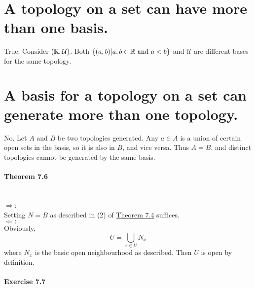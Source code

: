 \begin{parts}
 \part{A topology on a set can have more than one basis.}
 
\begin{solution}
 True. Consider $(\mathbb{R}, \mathcal{U})$. Both $\{(a,b)|a, b \in \mathbb{R} \text{ and } a < b\}$ and $\mathcal{U}$ are different bases for the same topology.
\end{solution}

 \part{A basis for a topology on a set can generate more than one topology.}
 
\begin{solution}
 No. Let $A$ and $B$ be two topologies generated. Any $a \in A$ is a union of certain open sets in the basis, so it is also in $B$, and vice versa. Thus $A = B$, and distinct topologies cannot be generated by the same basis.
\end{solution}
\end{parts}

\subsection{Theorem 7.6}
\setcounter{question}{0}


\begin{solution}
\\$\Rightarrow$: \\
Setting $N=B$ as described in (2) of \hyperref[thm4.7.4]{Theorem 7.4} suffices. \\
$\Leftarrow:$ \\
Obviously,
$$U = \bigcup_{x\in U} N_x$$
where $N_x$ is the basic open neighbourhood as described. Then $U$ is open by definition.
\end{solution}

\subsection{Exercise 7.7}
\setcounter{question}{0}

